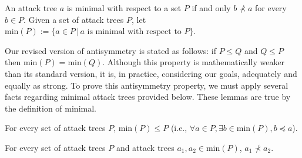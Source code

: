 \documentclass[runningheads]{llncs}
\theoremstyle{definition}
\begin{document}
\begin{definition}
  An attack tree $a$ is minimal with respect to a set $P$ if and only $b \nprec a$ for every $b \in P$. Given a set of attack trees $P$, let $\text{min}(P) := \{a \in P \,|\, a \text{ is minimal with respect to } P \}$.
\end{definition}

Our revised version of antisymmetry is stated as follows: if $P \le Q$ and $Q \le P$ then $\text{min}(P) = \text{min}(Q)$. Although this property is mathematically weaker than its standard version, it is, in practice, considering our goals, adequately and equally as strong. To prove this antisymmetry property, we must apply several facts regarding minimal attack trees provided below. These lemmas are true by the definition of minimal.

\begin{lemma}
  For every set of attack trees $P$, $\text{min}(P) \le P$ (i.e., $\forall a \in P, \exists b \in \text{min}(P), b \preceq a$).
\end{lemma}

\begin{lemma}
  For every set of attack trees $P$ and attack trees $a_1, a_2 \in \text{min}(P)$, $a_1 \nprec a_2$.
\end{lemma}
\end{document}
